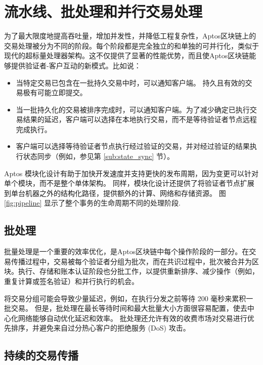 \documentclass{article}
\begin{document}
\section{流水线、批处理和并行交易处理}
\label{sec:pipelining_batching}

为了最大限度地提高吞吐量，增加并发性，并降低工程复杂性，Aptos区块链上的交易处理被分为不同的阶段。每个阶段都是完全独立的和单独的可并行化，类似于现代的超标量处理器架构。这不仅提供了显著的性能优势，而且使Aptos区块链能够提供验证者-客户互动的新模式。比如说：

\begin{itemize}
\item 当特定交易已包含在一批持久交易中时，可以通知客户端。 持久且有效的交易极有可能立即提交。

\item 当一批持久化的交易被排序完成时，可以通知客户端。为了减少确定已执行交易结果的延迟，客户端可以选择在本地执行交易，而不是等待验证者节点远程完成执行。
 
\item 客户端可以选择等待验证者节点执行经过验证的交易，并对经过验证的结果执行状态同步（例如，参见第 \ref{sub:state_sync} 节）。
\end{itemize}

Aptos 模块化设计有助于加快开发速度并支持更快的发布周期，因为变更可以针对单个模块，而不是整个单体架构。 同样，模块化设计还提供了将验证者节点扩展到单台机器之外的结构化路径，提供额外的计算、网络和存储资源。 图 \ref{fig:pipeline} 显示了整个事务的生命周期不同的处理阶段.

\subsection{批处理}
批量处理是一个重要的效率优化，是Aptos区块链中每个操作阶段的一部分。在交易传播过程中，交易被每个验证者分组为批次，而在共识过程中，批次被合并为区块。执行、存储和账本认证阶段也分批工作，以提供重新排序、减少操作（例如，重复计算或签名验证）和并行执行的机会。

将交易分组可能会导致少量延迟，例如，在执行分发之前等待 200 毫秒来累积一批交易。 但是，批处理在最长等待时间和最大批量大小方面很容易配置，使去中心化网络能够自动优化延迟和效率。 批处理还允许有效的收费市场对交易进行优先排序，并避免来自过分热心客户的拒绝服务 (DoS) 攻击。


\subsection{持续的交易传播}
\label{continuous_txn_dissemination}
\end{document}
